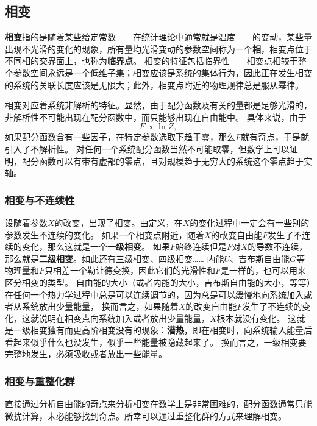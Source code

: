\documentclass[hyperref, UTF8, a4paper]{ctexart}
\begin{document}
\subsection{相变}

\textbf{相变}指的是随着某些给定常数——在统计理论中通常就是温度——的变动，某些量出现不光滑的变化的现象，所有量均光滑变动的参数空间称为一个\textbf{相}，相变点位于不同相的交界面上，也称为\textbf{临界点}。
相变的特征包括临界性——相变点相较于整个参数空间永远是一个低维子集；相变应该是系统的集体行为，因此正在发生相变的系统的关联长度应该是无限大；此外，相变点附近的物理规律总是服从幂律。

相变对应着系统非解析的特征。显然，由于配分函数及有关的量都是足够光滑的，非解析性不可能出现在配分函数中，而只能够出现在自由能中。
具体来说，由于
\[
    F \propto \ln Z,
\]
如果配分函数含有一些因子，在特定参数选取下趋于零，那么$F$就有奇点，于是就引入了不解析性。
对任何一个系统配分函数当然不可能取零，但数学上可以证明，配分函数可以有带有虚部的零点，且对规模趋于无穷大的系统这个零点趋于实轴。

\subsubsection{相变与不连续性}

设随着参数$X$的改变，出现了相变。由定义，在$X$的变化过程中一定会有一些别的参数发生不连续的变化。
如果一个相变点附近，随着$X$的改变自由能$F$发生了不连续的变化，那么这就是一个\textbf{一级相变}。
如果$F$始终连续但是$F$对$X$的导数不连续，那么就是\textbf{二级相变}。如此还有三级相变、四级相变……
内能$U$、吉布斯自由能$G$等物理量和$F$只相差一个勒让德变换，因此它们的光滑性和$F$是一样的，也可以用来区分相变的类型。
自由能的大小（或者内能的大小，吉布斯自由能的大小，等等）在任何一个热力学过程中总是可以连续调节的，因为总是可以缓慢地向系统加入或者从系统放出少量能量，
换而言之，如果随着$X$的改变自由能$F$发生了不连续的变化，这就说明在相变点向系统加入或者放出少量能量，$X$根本就没有变化。
这就是一级相变独有而更高阶相变没有的现象：\textbf{潜热}，即在相变时，向系统输入能量后看起来似乎什么也没发生，似乎一些能量被隐藏起来了。
换而言之，一级相变要完整地发生，必须吸收或者放出一些能量。

\subsubsection{相变与重整化群}

直接通过分析自由能的奇点来分析相变在数学上是非常困难的，配分函数通常只能微扰计算，未必能够找到奇点。所幸可以通过重整化群的方式来理解相变。
\end{document}
